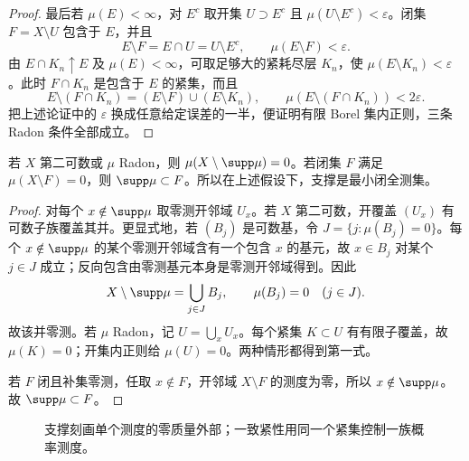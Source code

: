 \begin{proof}
最后若 $\mu(E)<\infty$，对 $E^c$ 取开集 $U\supset E^c$ 且
$\mu(U\setminus E^c)<\varepsilon$。闭集 $F=X\setminus U$ 包含于 $E$，并且
\[
 E\setminus F=E\cap U=U\setminus E^c,
 \qquad \mu(E\setminus F)<\varepsilon.
\]
由 $E\cap K_n\uparrow E$ 及 $\mu(E)<\infty$，可取足够大的紧耗尽层 $K_n$，使
$\mu(E\setminus K_n)<\varepsilon$。此时 $F\cap K_n$ 是包含于 $E$ 的紧集，而且
\[
 E\setminus(F\cap K_n)=(E\setminus F)\cup(E\setminus K_n),
 \qquad
 \mu(E\setminus(F\cap K_n))<2\varepsilon.
\]
把上述论证中的 $\varepsilon$ 换成任意给定误差的一半，便证明有限
Borel 集内正则，三条 Radon 条件全部成立。
\end{proof}

\begin{proposition}[支撑的最小性]\label{proposition:2-2-2-3}
若 $X$ 第二可数或 $\mu$ Radon，则
$\mu(X\setminus\supp\mu)=0$。若闭集 $F$ 满足 $\mu(X\setminus F)=0$，则
$\supp\mu\subset F$。所以在上述假设下，支撑是最小闭全测集。
\end{proposition}

\begin{proof}
对每个 $x\notin\supp\mu$ 取零测开邻域 $U_x$。若 $X$ 第二可数，开覆盖
$(U_x)$ 有可数子族覆盖其并。更显式地，若 $(B_j)$ 是可数基，令
$J=\{j:\mu(B_j)=0\}$。每个 $x\notin\supp\mu$ 的某个零测开邻域含有一个包含 $x$ 的基元，故
$x\in B_j$ 对某个 $j\in J$ 成立；反向包含由零测基元本身是零测开邻域得到。因此
\[
 X\setminus\supp\mu=\bigcup_{j\in J}B_j,
 \qquad \mu(B_j)=0\quad(j\in J).
\]
故该并零测。若 $\mu$ Radon，记
$U=\bigcup_xU_x$。每个紧集 $K\subset U$ 有有限子覆盖，故 $\mu(K)=0$；开集内正则给
$\mu(U)=0$。两种情形都得到第一式。

若 $F$ 闭且补集零测，任取 $x\notin F$，开邻域 $X\setminus F$ 的测度为零，所以
$x\notin\supp\mu$。故 $\supp\mu\subset F$。
\end{proof}

\begin{figure}[htbp]
\centering
{}
\caption{支撑刻画单个测度的零质量外部；一致紧性用同一个紧集控制一族概率测度。}
\label{fig:support-and-tightness}
\end{figure}

